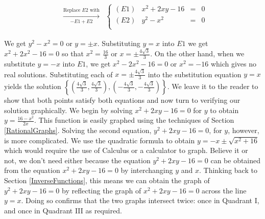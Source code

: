 \begin{ex}
\begin{enumerate}
\[\begin{array}{ccc}
&

\xrightarrow[\text{$-E1 + E2$}]{\text{Replace $E2$ with}}


&

\left\{\begin{array}{lrcr} (E1) &  x^2 +2xy -16 & = & 0 \\ (E2) & y^2 - x^2 & = & 0 \\ \end{array} \right.

\end{array} \]

We get $y^2 - x^2 = 0$ or $y = \pm x$.   Substituting $y=x$  into $E1$ we get $x^2+2x^2-16 = 0$ so that $x^2 = \frac{16}{3}$ or $x = \pm \frac{4 \sqrt{3}}{3}$.  On the other hand, when we substitute $y = -x$ into $E1$, we get $x^2 - 2x^2 - 16 = 0$ or $x^2 = -16$ which gives no real solutions.  Substituting each of $x = \pm \frac{4 \sqrt{3}}{3}$ into the substitution equation $y=x$ yields the solution $\left\{\left(\frac{4 \sqrt{3}}{3},\frac{4 \sqrt{3}}{3}\right), \left(-\frac{4 \sqrt{3}}{3},-\frac{4 \sqrt{3}}{3}\right)\right\}$.  We leave it to the reader to show that both points satisfy both equations and now turn to verifying our solution graphically.  We begin by solving $x^2 +2xy -16 = 0$ for $y$ to obtain $y = \frac{16 - x^2}{2x}$.  This function is easily graphed using the techniques of Section \ref{RationalGraphs}.  Solving the second equation, $y^2 +2xy -16 = 0$, for $y$, however, is more complicated.  We use the quadratic formula to obtain $y = -x \pm \sqrt{x^2+16}$ which would require the use of Calculus or a calculator to graph.  Believe it or not, we don't need either because the equation $y^2+2xy-16 = 0$ can be obtained from the equation $x^2+2xy-16=0$ by interchanging $y$ and $x$.  Thinking back to Section \ref{InverseFunctions}, this means we can obtain the graph of  $y^2+2xy-16 = 0$ by reflecting the graph of  $x^2+2xy-16 = 0$ across the line $y=x$.  Doing so confirms that the two graphs intersect twice: once in Quadrant I, and once in Quadrant III as required.

\begin{center}


\end{center}
\end{enumerate}
\end{ex}
